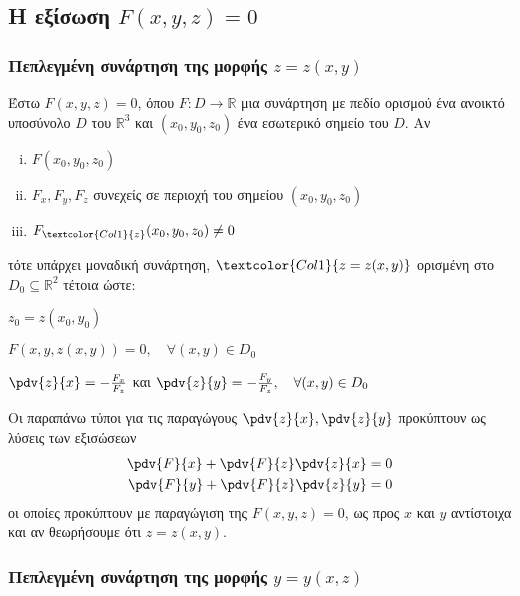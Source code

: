 \subsection{Η εξίσωση \ensuremath{F(x,y,z) = 0}}

\subsubsection{Πεπλεγμένη συνάρτηση της μορφής \ensuremath{z=z(x,y)}}

Έστω $ F(x,y,z) = 0 $, όπου $F\colon D \to \mathbb{R}$ μια συνάρτηση με πεδίο ορισμού 
ένα ανοικτό υποσύνολο $ D $ του $ \mathbb{R}^{3}  $ και $ (x_0,y_0,z_0) $ ένα 
εσωτερικό σημείο του $ D $. Αν
\begin{enumerate}[(i)]
  \item $ F(x_0,y_0,z_0) $
  \item $ F_x, F_y, F_z $ συνεχείς σε περιοχή του σημείου $ (x_0,y_0,z_0) $
  \item $ F_{\textcolor{Col1}{z}}(x_0,y_0,z_0) \neq 0 $
\end{enumerate}
τότε υπάρχει μοναδική συνάρτηση, $ \textcolor{Col1}{z=z(x,y)} $ ορισμένη στο 
$ D_0 \subseteq \mathbb{R}^{2} $ τέτοια ώστε:
\begin{myitemize}
  \item $ z_0 = z(x_0,y_0) $
  \item $ F(x,y,z(x,y)) = 0,  \quad \forall (x,y)\in  D_0 $
  \item $ \pdv{z}{x} = - \frac{F_x}{F_z} $ και $ \pdv{z}{y} = - \frac{F_y}{F_z}, 
    \quad \forall (x,y) \in D_0$
\end{myitemize}

\begin{rem}
  Οι παραπάνω τύποι για τις παραγώγους $ \pdv{z}{x}, \pdv{z}{y} $ προκύπτουν 
  ως λύσεις των εξισώσεων  
  \begin{align*}	
    \pdv{F}{x} + \pdv{F}{z}\pdv{z}{x} &= 0 \\
    \pdv{F}{y} + \pdv{F}{z}\pdv{z}{y} &= 0 
  \end{align*}
  οι οποίες προκύπτουν με παραγώγιση της $ F(x,y,z) = 0 $, ως προς $x$ και $y$ 
  αντίστοιχα και  αν θεωρήσουμε ότι $ z=z(x,y) $.
\end{rem}

\subsubsection{Πεπλεγμένη συνάρτηση της μορφής \ensuremath{y=y(x,z)}}


